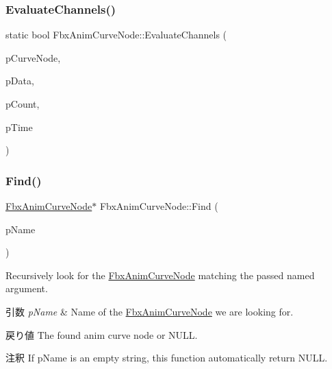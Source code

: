 \subsubsection{\texorpdfstring{Evaluate\+Channels()}{EvaluateChannels()}}
{\footnotesize\ttfamily static bool Fbx\+Anim\+Curve\+Node\+::\+Evaluate\+Channels (\begin{DoxyParamCaption}\item[{\hyperlink{class_fbx_anim_curve_node}{Fbx\+Anim\+Curve\+Node} $\ast$}]{p\+Curve\+Node,  }\item[{double $\ast$}]{p\+Data,  }\item[{unsigned int}]{p\+Count,  }\item[{\hyperlink{class_fbx_time}{Fbx\+Time}}]{p\+Time }\end{DoxyParamCaption})\hspace{0.3cm}{\ttfamily [static]}}

\mbox{\label{class_fbx_anim_curve_node_aca6ee712b7eeafb1d00f42117520bac4}} 
\subsubsection{\texorpdfstring{Find()}{Find()}\hspace{0.1cm}{\footnotesize\ttfamily [1/2]}}
{\footnotesize\ttfamily \hyperlink{class_fbx_anim_curve_node}{Fbx\+Anim\+Curve\+Node}$\ast$ Fbx\+Anim\+Curve\+Node\+::\+Find (\begin{DoxyParamCaption}\item[{const char $\ast$}]{p\+Name }\end{DoxyParamCaption})}

Recursively look for the \hyperlink{class_fbx_anim_curve_node}{Fbx\+Anim\+Curve\+Node} matching the passed named argument. 
\begin{DoxyParams}{引数}
{\em p\+Name} & Name of the \hyperlink{class_fbx_anim_curve_node}{Fbx\+Anim\+Curve\+Node} we are looking for. \\
\hline
\end{DoxyParams}
\begin{DoxyReturn}{戻り値}
The found anim curve node or N\+U\+LL. 
\end{DoxyReturn}
\begin{DoxyRemark}{注釈}
If p\+Name is an empty string, this function automatically return N\+U\+LL. 
\end{DoxyRemark}
\mbox{\label{class_fbx_anim_curve_node_aa60f953e94636bb23a94860f60cc63e1}} 
